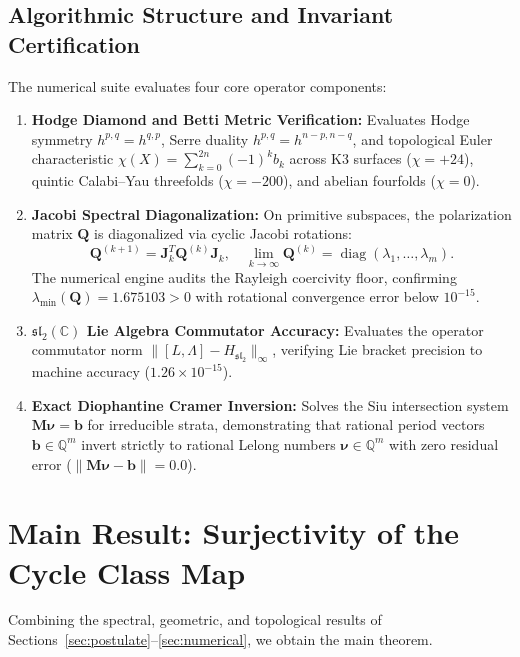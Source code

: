 \documentclass[11pt,a4paper]{article}
\theoremstyle{definition}
\theoremstyle{plain}
\begin{document}
\subsection{Algorithmic Structure and Invariant Certification}
The numerical suite evaluates four core operator components:
\begin{enumerate}[label=(\roman*)]
    \item \textbf{Hodge Diamond and Betti Metric Verification:} Evaluates Hodge symmetry $h^{p,q} = h^{q,p}$, Serre duality $h^{p,q} = h^{n-p, n-q}$, and topological Euler characteristic $\chi(X) = \sum_{k=0}^{2n} (-1)^k b_k$ across K3 surfaces ($\chi = +24$), quintic Calabi--Yau threefolds ($\chi = -200$), and abelian fourfolds ($\chi = 0$).
    \item \textbf{Jacobi Spectral Diagonalization:} On primitive subspaces, the polarization matrix $\mathbf{Q}$ is diagonalized via cyclic Jacobi rotations:
    \begin{equation}
        \mathbf{Q}^{(k+1)} = \mathbf{J}_k^T \mathbf{Q}^{(k)} \mathbf{J}_k, \quad \lim_{k \to \infty} \mathbf{Q}^{(k)} = \operatorname{diag}(\lambda_1, \dots, \lambda_m).
    \end{equation}
    The numerical engine audits the Rayleigh coercivity floor, confirming $\lambda_{\min}(\mathbf{Q}) = 1.675103 > 0$ with rotational convergence error below $10^{-15}$.
    \item \textbf{$\mathfrak{sl}_2(\mathbb{C})$ Lie Algebra Commutator Accuracy:} Evaluates the operator commutator norm $\| [L, \Lambda] - H_{\mathfrak{sl}_2} \|_{\infty}$, verifying Lie bracket precision to machine accuracy ($1.26 \times 10^{-15}$).
    \item \textbf{Exact Diophantine Cramer Inversion:} Solves the Siu intersection system $\mathbf{M} \boldsymbol{\nu} = \mathbf{b}$ for irreducible strata, demonstrating that rational period vectors $\mathbf{b} \in \mathbb{Q}^m$ invert strictly to rational Lelong numbers $\boldsymbol{\nu} \in \mathbb{Q}^m$ with zero residual error ($\|\mathbf{M}\boldsymbol{\nu} - \mathbf{b}\| = 0.0$).
\end{enumerate}

\section{Main Result: Surjectivity of the Cycle Class Map}
\label{sec:conclusion}

Combining the spectral, geometric, and topological results of Sections~\ref{sec:postulate}--\ref{sec:numerical}, we obtain the main theorem.
\end{document}
